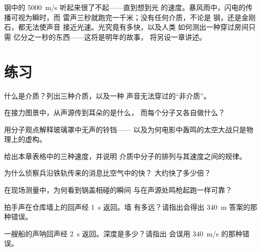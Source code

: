 \begin{remark}[“快”仍有局限]\label{rem:g7:sound-production:light}
钢中的 \qty{5000}{m/s} 听起来很了不起——直到想到光
的速度。暴风雨中，闪电的传播可视为瞬时，而
雷声三秒就跑完一千米；没有任何介质，不论是
钢，还是金刚石，都无法使声音
接近光速。光究竟有多快，以及人类
如何测出一种穿过房间只需
亿分之一秒的东西——这将是明年的故事，
将另设一章讲述。
\end{remark}

\section{练习}

\begin{exercise}[$\star$]\label{exo:g7:sound-production:1}
什么是介质？列出三种介质，以及一种
声音无法穿过的“非介质”。
\end{exercise}

\begin{exercise}[$\star$]\label{exo:g7:sound-production:2}
在接力图景中，从声源传到耳朵的是什么，
而每个分子又各自做什么？
\end{exercise}

\begin{exercise}[$\star$]\label{exo:g7:sound-production:3}
用分子观点解释玻璃罩中无声的铃铛——
以及为何电影中轰鸣的太空大战只是物理上的虚构。
\end{exercise}

\begin{exercise}[$\star$]\label{exo:g7:sound-production:4}
给出本章表格中的三种速度，并说明
介质中分子的排列与其速度之间的规律。
\end{exercise}

\begin{exercise}[$\star$]\label{exo:g7:sound-production:5}
为什么侦察兵沿铁轨传来的消息比空气中的快？
大约快了多少倍？
\end{exercise}

\begin{exercise}[$\star$]\label{exo:g7:sound-production:6}
在现场测量中，为何看到锅盖相碰的瞬间
与在声源处鸣枪起跑一样可靠？
\end{exercise}

\begin{exercise}[$\star$]\label{exo:g7:sound-production:7}
拍手声在仓库墙上的回声经 \qty{1}{s} 返回。墙
有多远？请指出会得出
\qty{340}{m} 答案的那种错误。
\end{exercise}

\begin{exercise}[$\star$]\label{exo:g7:sound-production:8}
一艘船的声呐回声经 \qty{2}{s} 返回。深度是多少？请指出
会误用 \qty{340}{m/s} 的那种错误。
\end{exercise}

